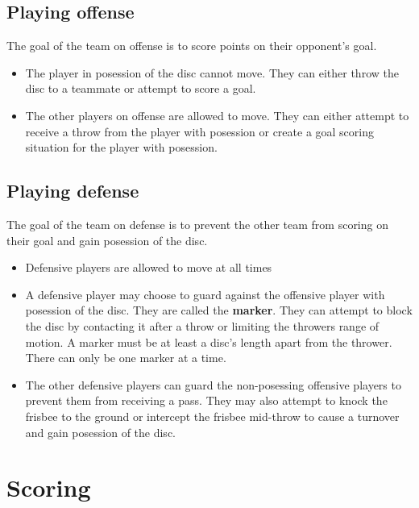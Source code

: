 \documentclass[10pt]{article}
\begin{document}
\subsection{Playing offense}

The goal of the team on offense is to score points on their opponent's goal.

\begin{itemize}
    \item The player in posession of the disc cannot move. They can either throw the disc to a teammate or attempt to score a goal.
    \item The other players on offense are allowed to move. They can either attempt to receive a throw from the player with posession or create a goal scoring situation for the player with posession.
\end{itemize}

\subsection{Playing defense}

The goal of the team on defense is to prevent the other team from scoring on their goal and gain posession of the disc.

\begin{itemize}
    \item Defensive players are allowed to move at all times
    \item A defensive player may choose to guard against the offensive player with posession of the disc. They are called the \textbf{marker}. They can attempt to block the disc by contacting it after a throw or limiting the throwers range of motion. A marker must be at least a disc's length apart from the thrower. There can only be one marker at a time.
    \item The other defensive players can guard the non-posessing offensive players to prevent them from receiving a pass. They may also attempt to knock the frisbee to the ground or intercept the frisbee mid-throw to cause a turnover and gain posession of the disc.
\end{itemize}

\section{Scoring}
\end{document}
